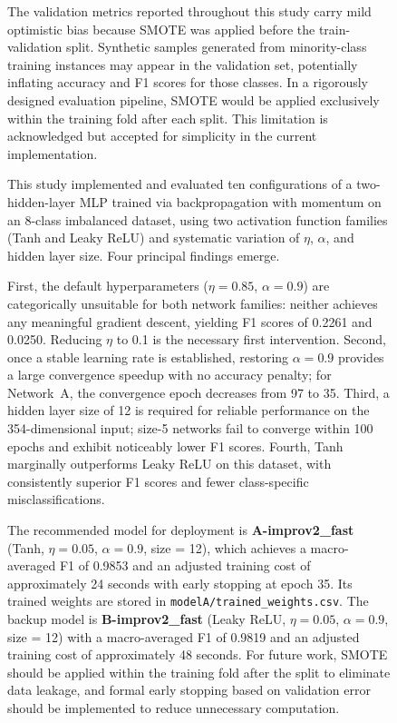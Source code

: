 \documentclass{acm_proc_article-sp} \usepackage{graphicx} \usepackage{amsmath} \usepackage{booktabs} \usepackage{url}
\begin{document}
\begin{figure}[ht]
{The validation metrics reported throughout this study carry mild optimistic bias because SMOTE was applied before the train-validation split. Synthetic samples generated from minority-class training instances may appear in the validation set, potentially inflating accuracy and F1 scores for those classes. In a rigorously designed evaluation pipeline, SMOTE would be applied exclusively within the training fold after each split. This limitation is acknowledged but accepted for simplicity in the current implementation.


This study implemented and evaluated ten configurations of a two-hidden-layer MLP trained via backpropagation with momentum on an 8-class imbalanced dataset, using two activation function families (Tanh and Leaky ReLU) and systematic variation of $\eta$, $\alpha$, and hidden layer size. Four principal findings emerge.

First, the default hyperparameters ($\eta = 0.85$, $\alpha = 0.9$) are categorically unsuitable for both network families: neither achieves any meaningful gradient descent, yielding F1 scores of 0.2261 and 0.0250. Reducing $\eta$ to 0.1 is the necessary first intervention. Second, once a stable learning rate is established, restoring $\alpha = 0.9$ provides a large convergence speedup with no accuracy penalty; for Network~A, the convergence epoch decreases from 97 to 35. Third, a hidden layer size of 12 is required for reliable performance on the 354-dimensional input; size-5 networks fail to converge within 100 epochs and exhibit noticeably lower F1 scores. Fourth, Tanh marginally outperforms Leaky ReLU on this dataset, with consistently superior F1 scores and fewer class-specific misclassifications.

The recommended model for deployment is \textbf{A-improv2_fast} (Tanh, $\eta = 0.05$, $\alpha = 0.9$, size = 12), which achieves a macro-averaged F1 of 0.9853 and an adjusted training cost of approximately 24 seconds with early stopping at epoch 35. Its trained weights are stored in \texttt{modelA/trained_weights.csv}. The backup model is \textbf{B-improv2_fast} (Leaky ReLU, $\eta = 0.05$, $\alpha = 0.9$, size = 12) with a macro-averaged F1 of 0.9819 and an adjusted training cost of approximately 48 seconds. For future work, SMOTE should be applied within the training fold after the split to eliminate data leakage, and formal early stopping based on validation error should be implemented to reduce unnecessary computation.

}
\end{figure}
\end{document}
